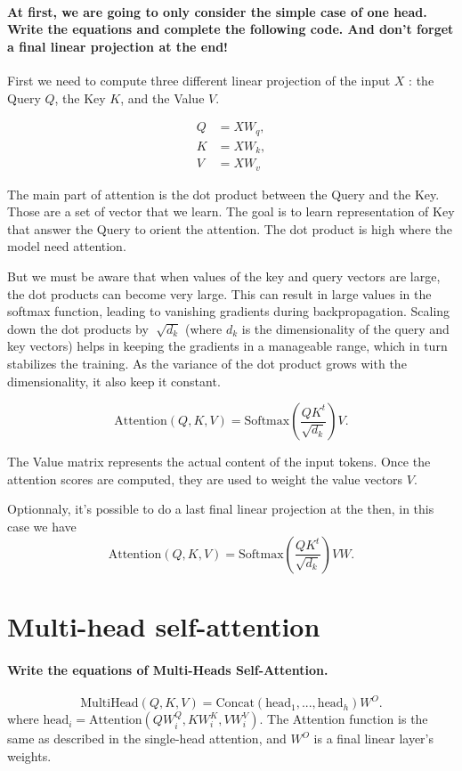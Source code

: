 \paragraph{At first, we are going to only consider the simple case of one head. Write the equations and complete the following code. And don't forget a final linear projection at the end!}

First we need to compute three different linear projection of the input $ X $ : the Query $ Q $, the Key $ K $, and the Value $ V $.

\begin{align*}
    Q & = X W_q, \\
    K & = X W_k, \\
    V & = X W_v
\end{align*}

The main part of attention is the dot product between the Query and the Key. Those are a set of vector that we learn. The goal is to learn representation of Key that answer the Query to orient the attention. The dot product is high where the model need attention.

But we must be aware that when values of the key and query vectors are large, the dot products can become very large. This can result in large values in the softmax function, leading to vanishing gradients during backpropagation. Scaling down the dot products by $ \sqrt[]{d_k} $ (where $ d_k $  is the dimensionality of the query and key vectors) helps in keeping the gradients in a manageable range, which in turn stabilizes the training. As the variance of the dot product grows with the dimensionality, it also keep it constant.

\[
    \text{Attention}(Q, K, V) = \text{Softmax}\left(\frac{QK^t}{\sqrt{d_k}}\right)V
.\]

The Value matrix represents the actual content of the input tokens. Once the attention scores are computed, they are used to weight the value vectors $ V $.

Optionnaly, it's possible to do a last final linear projection at the then, in this case we have 
\[
    \text{Attention}(Q, K, V) = \text{Softmax}\left(\frac{QK^t}{\sqrt{d_k}}\right)V W
.\]


\section{Multi-head self-attention}

\paragraph{Write the equations of Multi-Heads Self-Attention.}
\[
    \text{MultiHead}(Q, K, V) = \text{Concat}(\text{head}_1, ..., \text{head}_h)W^O
    .\]
where $\text{head}_i = \text{Attention}(QW_i^Q, KW_i^K, VW_i^V)$. The Attention function is the same as described in the single-head attention, and $W^O$ is a final linear layer's weights.

